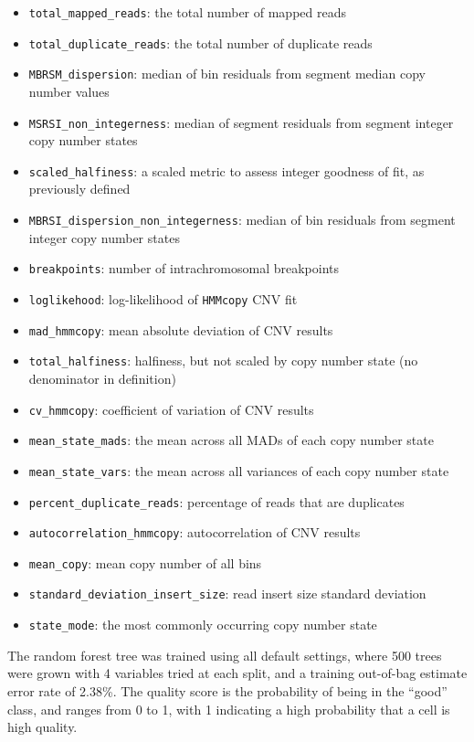\documentclass{article}
\begin{document}
\begin{itemize}
    \item \texttt{total\_mapped\_reads}: the total number of mapped reads
    \item \texttt{total\_duplicate\_reads}: the total number of duplicate reads
    \item \texttt{MBRSM\_dispersion}: median of bin residuals from segment median copy number values
    \item \texttt{MSRSI\_non\_integerness}: median of segment residuals from segment integer copy number states
    \item \texttt{scaled\_halfiness}: a scaled metric to assess integer goodness of fit, as previously defined
    \item \texttt{MBRSI\_dispersion\_non\_integerness}: median of bin residuals from segment integer copy number states
    \item \texttt{breakpoints}: number of intrachromosomal breakpoints
    \item \texttt{loglikehood}: log-likelihood of \texttt{HMMcopy} CNV fit
    \item \texttt{mad\_hmmcopy}: mean absolute deviation of CNV results
    \item \texttt{total\_halfiness}: halfiness, but not scaled by copy number state (no denominator in definition)
    \item \texttt{cv\_hmmcopy}: coefficient of variation of CNV results
    \item \texttt{mean\_state\_mads}: the mean across all MADs of each copy number state
    \item \texttt{mean\_state\_vars}: the mean across all variances of each copy number state
    \item \texttt{percent\_duplicate\_reads}: percentage of reads that are duplicates
    \item \texttt{autocorrelation\_hmmcopy}: autocorrelation of CNV results
    \item \texttt{mean\_copy}: mean copy number of all bins
    \item \texttt{standard\_deviation\_insert\_size}: read insert size standard deviation
    \item \texttt{state\_mode}: the most commonly occurring copy number state

\end{itemize}

The random forest tree was trained using all default settings, where 500 trees were grown with 4 variables tried at each split, and a training out-of-bag estimate error rate of 2.38\%. The quality score is the probability of being in the ``good'' class, and ranges from 0 to 1, with 1 indicating a high probability that a cell is high quality.
\end{document}
